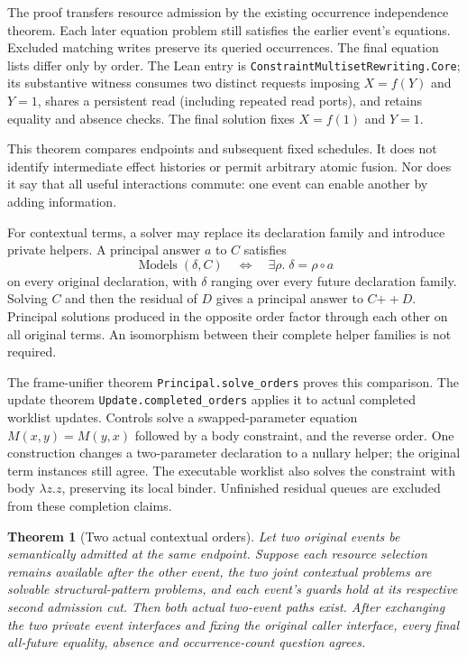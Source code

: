 \documentclass[11pt]{article}
\newtheorem{theorem}{Theorem}
\newcommand{\Models}{\operatorname{Models}}
\newcommand{\code}[1]{\texttt{\small #1}}
\begin{document}
The proof transfers resource admission by the existing occurrence
independence theorem. Each later equation problem still satisfies the
earlier event's equations. Excluded matching writes preserve its queried
occurrences. The final equation lists differ only by order. The Lean entry
is \code{ConstraintMultisetRewriting.Core}; its substantive witness consumes
two distinct requests imposing $X=f(Y)$ and $Y=1$, shares a persistent read
(including repeated read ports), and retains equality and absence checks.
The final solution fixes $X=f(1)$ and $Y=1$.

This theorem compares endpoints and subsequent fixed schedules. It does not
identify intermediate effect histories or permit arbitrary atomic fusion.
Nor does it say that all useful interactions commute: one event can enable
another by adding information.

For contextual terms, a solver may replace its declaration family and
introduce private helpers. A principal answer $a$ to $C$ satisfies
\[
 \Models(\delta,C)\quad\Longleftrightarrow\quad
 \exists\rho.\;\delta=\rho\circ a
\]
on every original declaration, with $\delta$ ranging over every future
declaration family. Solving $C$ and then the residual of $D$ gives a
principal answer to $C\mathbin{+\!+}D$. Principal solutions produced in
the opposite order factor through each other on all original terms.
An isomorphism between their complete helper families is not required.

The frame-unifier theorem \code{Principal.solve\_orders} proves this comparison.
The update theorem \code{Update.completed\_orders} applies it to actual
completed worklist updates. Controls solve a swapped-parameter equation
$M(x,y)=M(y,x)$ followed by a body constraint, and the reverse order.
One construction changes a two-parameter declaration to a nullary helper;
the original term instances still agree. The executable worklist also
solves the constraint with body $\lambda z.z$, preserving its local binder.
Unfinished residual queues are excluded from these completion claims.

\begin{theorem}[Two actual contextual orders]
Let two original events be semantically admitted at the same endpoint.
Suppose each resource selection remains available after the other event,
the two joint contextual problems are solvable structural-pattern problems,
and each event's guards hold at its respective second admission cut.
Then both actual two-event paths exist. After exchanging the two private
event interfaces and fixing the original caller interface, every final
all-future equality, absence and occurrence-count question agrees.
\end{theorem}
\end{document}
